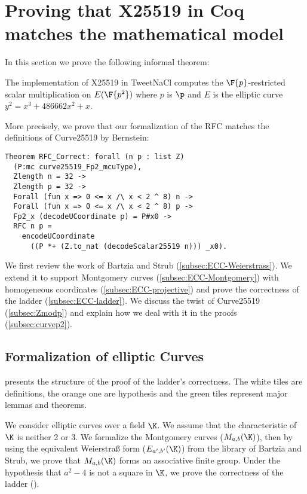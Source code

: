 \section{Proving that X25519 in Coq matches the mathematical model}
\label{sec:maths}

In this section we prove the following informal theorem:

\begin{informaltheorem}
  The implementation of X25519 in TweetNaCl computes the
  $\F{p}$-restricted \xcoord scalar multiplication on $E(\F{p^2})$ where $p$ is $\p$
  and $E$ is the elliptic curve $y^2 = x^3 + 486662 x^2 + x$.
\end{informaltheorem}

More precisely, we prove that our formalization of the RFC matches the definitions of Curve25519 by Bernstein:
\begin{lstlisting}[language=Coq]
Theorem RFC_Correct: forall (n p : list Z)
  (P:mc curve25519_Fp2_mcuType),
  Zlength n = 32 ->
  Zlength p = 32 ->
  Forall (fun x => 0 <= x /\ x < 2 ^ 8) n ->
  Forall (fun x => 0 <= x /\ x < 2 ^ 8) p ->
  Fp2_x (decodeUCoordinate p) = P#x0 ->
  RFC n p =
    encodeUCoordinate
      ((P *+ (Z.to_nat (decodeScalar25519 n))) _x0).
\end{lstlisting}

We first review the work of Bartzia and Strub \cite{BartziaS14} (\ref{subsec:ECC-Weierstrass}).
We extend it to support Montgomery curves (\ref{subsec:ECC-Montgomery})
with homogeneous coordinates (\ref{subsec:ECC-projective}) and prove the
correctness of the ladder (\ref{subsec:ECC-ladder}).
We discuss the twist of Curve25519 (\ref{subsec:Zmodp}) and explain how we deal
with it in the proofs (\ref{subsec:curvep2}).

\subsection{Formalization of elliptic Curves}
\label{subsec:ECC}

 presents the structure of the proof of the ladder's
correctness. The white tiles are definitions, the orange one are hypothesis and
the green tiles represent major lemmas and theorems.

We consider elliptic curves over a field $\K$. We assume that the
characteristic of $\K$ is neither 2 or 3.
We formalize the Montgomery curves ($M_{a,b}(\K)$), then by using the equivalent
Weierstra{\ss} form ($E_{a',b'}(\K)$) from the library of Bartzia and Strub, we prove
that $M_{a,b}(\K)$ forms an associative finite group. Under the hypothesis that
$a^2 - 4$ is not a square in $\K$, we prove the correctness of the ladder ().

